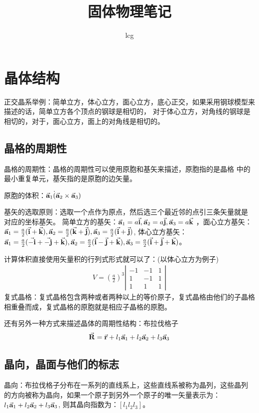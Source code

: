 \documentclass[UTF8]{article}
\title{固体物理笔记}
\author{lcg}
\numberwithin{equation}{section}
\begin{document}
\maketitle
\tableofcontents
\newpage
\section{晶体结构}
正交晶系举例：简单立方，体心立方，面心立方，底心正交，如果采用钢球模型来描述的话，简单立方各个顶点的钢球是相切的，
对于体心立方，对角线的钢球是相切的，对于，面心立方，面上的对角线是相切的。
\subsection{晶格的周期性}
晶格的周期性：晶格的周期性可以使用原胞和基矢来描述，原胞指的是晶格
中的最小重复单元，基矢指的是原胞的边矢量。

原胞的体积：$\va{a}_1\dot(\va{a}_2\times\va{a}_3)$

基矢的选取原则：选取一个点作为原点，然后选三个最近邻的点引三条矢量就是
对应的坐标基矢。
简单立方的基矢：$\va{a}_1=a\va{i},\va{a}_2=a\va{j},\va{a}_3=a\va{k}$
，面心立方基矢：$\va{a}_1=\frac{a}{2}(\va{i}+\va{k}),\va{a}_2=
    \frac{a}{2}(\va{k}+\va{j}),\va{a}_3=\frac{a}{2}(\va{i}+\va{j})$,
体心立方基矢：$\va{a}_1=\frac{a}{2}(\va{-i}+\va{-j}+\va{k}),\va{a}_2=\frac{a}{2}(\va{i}-\va{j}+\va{k}),
    \va{a}_3=\frac{a}{2}(\va{i}+\va{j}+\va{k})$。

计算体积直接使用矢量积的行列式形式就可以了：(以体心立方为例子)
\begin{align*}
    V=(\frac{a}{2})^3\left|\begin{array}{ccc}
                               -1 & -1 & 1 \\
                               1  & -1 & 1 \\
                               1  & 1  & 1
                           \end{array}\right|
\end{align*}
复式晶格：复式晶格包含两种或者两种以上的等价原子，复式晶格由他们的子晶格相重叠而成，复式晶格的原胞就是相应子晶格的原胞。


还有另外一种方式来描述晶体的周期性结构：布拉伐格子
\begin{align*}
    \va{R}=\va{r}+l_1\va{a}_1+l_2\va{a}_2+l_3\va{a}_3
\end{align*}
\subsection{晶向，晶面与他们的标志}
晶向：布拉伐格子分布在一系列的直线系上，这些直线系被称为晶列，这些晶列
的方向被称为晶向，如果一个原子到另外一个原子的唯一矢量表示为：$l_1\va{a}_1+l_2\va{a}_2+l_3\va{a}_3$,
则其晶向指数为：$[l_1l_2l_3]$。
\end{document}
